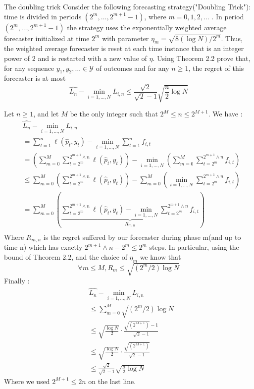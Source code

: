 \begin{exercise}[]{The doubling trick}
	Consider the following forecasting strategy("Doubling Trick"): time is divided in periods $ (2^m,\ldots, 2^{m+1}-1) $, where $ m=0,1,2,\ldots $ . In period $ (2^m,\ldots,2^{m+1}-1) $ the strategy uses the exponentially weighted average forecaster initialized at time $ 2^{m} $ with parameter $ \eta_m = \sqrt{8(\log N)/2^m} $. Thus, the weighted average forecaster is reset at each time instance that is an integer power of 2 and is restarted with a new value of $ \eta $. Using Theorem 2.2 prove that, for any sequence $ y_1,y_2,\ldots \in \mathcal{Y}  $ of outcomes and for any $ n\geq 1 $, the regret of this forecaster is at most
\begin{equation*}
	\widehat{L_n} - \min_{i=1,\ldots,N} L_{i,n} \leq \frac{\sqrt{2}}{\sqrt{2}-1} \sqrt{\frac{n}{2}\log N}
\end{equation*}

\end{exercise}

\begin{solution}[]
	Let $ n\geq 1 $, and let $ M $ be the only integer such that $ 2^{M}\leq n \leq  2^{M+1}$. We have :
\begin{align*}
	&\widehat{L_n} - \min_{i=1,\ldots,N} L_{i,n} \\
	&= \sum_{t=1}^{n} \ell(\hat{p}_t,y_t) - \min_{i=1,\ldots,N}\sum_{t=1}^{n}f_{i,t} \\
	&= \left( \sum_{m=0}^{M}\sum_{t=2^{m}}^{2^{m+1}\wedge n} \ell(\hat{p}_t,y_t) \right) -  \min_{i=1,\ldots,N}\left(\sum_{m=0}^{M}\sum_{t=2^m}^{2^{m+1}\wedge n}f_{i,t} \right)\\
	&\leq   \sum_{m=0}^{M}\left(\sum_{t=2^{m}}^{2^{m+1}\wedge n} \ell(\hat{p}_t,y_t) \right) -  \sum_{m=0}^{M}\left(\min_{i=1,\ldots,N}\sum_{t=2^m}^{2^{m+1}\wedge n}f_{i,t} \right)\\
	&=   \sum_{m=0}^{M}\left(\underbrace{\sum_{t=2^{m}}^{2^{m+1}\wedge n} \ell(\hat{p}_t,y_t)  -  \min_{i=1,\ldots,N}\sum_{t=2^m}^{2^{m+1}\wedge n}f_{i,t} }_{R_{m,n}}\right)\\
\end{align*}
Where $ R_{m,n} $ is the regret suffered by our forecaster during phase m(and up to time n) which has exactly $ 2^{m+1}\wedge n - 2^{m} \leq 2^{m} $ steps. In particular, using the bound of Theorem 2.2, and the choice of $ \eta_m $ we know that 
\begin{equation*}
	\forall m\leq M, R_m \leq \sqrt{(2^{m}/2)\log N}
\end{equation*}
Finally :
\begin{align*}
	&\widehat{L_n} - \min_{i=1,\ldots,N} L_{i,n} \\
	&\leq \sum_{m=0}^{M} \sqrt{(2^{m}/2)\log N} \\
	&\leq \sqrt{\frac{\log N}{2}}\cdot \frac{\sqrt{(2^{M+1})}-1}{\sqrt{2}-1}\\
	&\leq \sqrt{\frac{\log N}{2}}\cdot \frac{\sqrt{(2^{M+1})}}{\sqrt{2}-1}\\
	&\leq \frac{\sqrt{2}}{\sqrt{2}-1}\sqrt{\frac{n}{2}\log N}
\end{align*}
Where we used $ 2^{M+1} \leq 2n $ on the last line.

\end{solution}
